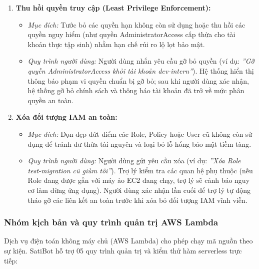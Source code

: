 \documentclass[a4paper,12pt]{article}
\begin{document}
\begin{enumerate}
  \item \textbf{Thu hồi quyền truy cập (Least Privilege Enforcement):}
  \begin{itemize}
    \item \textit{Mục đích:} Tước bỏ các quyền hạn không còn sử dụng hoặc thu hồi các quyền nguy hiểm (như quyền AdministratorAccess cấp thừa cho tài khoản thực tập sinh) nhằm hạn chế rủi ro lộ lọt bảo mật.
    \item \textit{Quy trình người dùng:} Người dùng nhắn yêu cầu gỡ bỏ quyền (ví dụ: \textit{''Gỡ quyền AdministratorAccess khỏi tài khoản dev-intern''}). Hệ thống hiển thị thông báo phạm vi quyền chuẩn bị gỡ bỏ; sau khi người dùng xác nhận, hệ thống gỡ bỏ chính sách và thông báo tài khoản đã trở về mức phân quyền an toàn.
  \end{itemize}

  \item \textbf{Xóa đối tượng IAM an toàn:}
  \begin{itemize}
    \item \textit{Mục đích:} Dọn dẹp dứt điểm các Role, Policy hoặc User cũ không còn sử dụng để tránh dư thừa tài nguyên và loại bỏ lỗ hổng bảo mật tiềm tàng.
    \item \textit{Quy trình người dùng:} Người dùng gửi yêu cầu xóa (ví dụ: \textit{''Xóa Role test-migration cũ giùm tôi''}). Trợ lý kiểm tra các quan hệ phụ thuộc (nếu Role đang được gắn với máy ảo EC2 đang chạy, trợ lý sẽ cảnh báo nguy cơ làm dừng ứng dụng). Người dùng xác nhận lần cuối để trợ lý tự động tháo gỡ các liên kết an toàn trước khi xóa bỏ đối tượng IAM vĩnh viễn.
  \end{itemize}
\end{enumerate}

\subsubsection{Nhóm kịch bản và quy trình quản trị AWS Lambda}

Dịch vụ điện toán không máy chủ (AWS Lambda) cho phép chạy mã nguồn theo sự kiện. SatiBot hỗ trợ 05 quy trình quản trị và kiểm thử hàm serverless trực tiếp:
\end{document}
